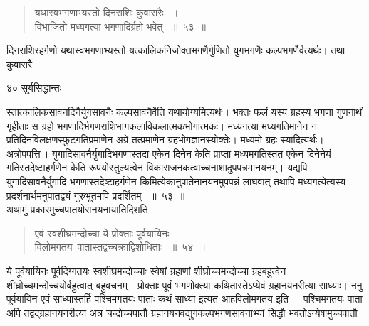 \documentclass[11pt, openany]{book}
\begin{document}
\begin{quote}

 {\ssi यथास्वभगणाभ्यस्तो दिनराशिः कुवासरैः ~।\\
विभाजितो मध्यगत्या भगणादिर्ग्रहो भवेत् ~॥~५३~॥}
\end{quote}
\begin{sloppypar}
 दिनराशिरहर्गणो यथास्वभगणाभ्यस्तो यत्कालिकनिजोक्तभगणैर्गुणितो युगभगणैः कल्पभगणैर्वत्यर्थः। तथा कुवासरै\textendash
\end{sloppypar}
\newpage


\noindent ४० \hspace{4cm} सूर्यसिद्धान्तः
\vspace{1cm}

\begin{sloppypar}
\noindent स्तात्कालिकसावनदिनैर्युगसावनैः कल्पसावनैर्वेति यथायोग्यमित्यर्थः। भक्तः फलं यस्य ग्रहस्य भगणा गुणनार्थं गृहीताः स ग्रहो भगणादिर्भगणराशिभागकलाविकलात्मकभोगात्मकः। मध्यगत्या मध्यगतिमानेन न प्रतिदिनविलक्षणस्फुटगतिप्रमाणेन अग्रे तत्प्रमाणेन ग्रहभोगज्ञानस्योक्तेः। मध्यमो ग्रहः स्यादित्यर्थः। अत्रोपपत्तिः। युगादिसावनैर्युगादिभगणास्तदा एकेन दिनेन केति प्राप्ता मध्यमगतिस्तत एकेन दिनेनेयं गतिस्तदेष्टाहर्गणेन केति रूपयोस्तुल्यत्वेन विकाराजनकत्वाच्चनाशादुपपन्नमानयनम्। यद्यपि युगादिसावनैर्युगादि भगणास्तदेष्टाहर्गणेन किमित्येकानुपातेनानयनमुपपन्नं लाघवात् तथापि मध्यगत्येत्यस्य प्रदर्शनार्थमनुपातद्वयं गुरुभूतमपि प्रदर्शितम् ~॥~५३~॥\\
\noindent अथामुं प्रकारमुच्चपातयोरानयनायातिदिशति\textendash
\end{sloppypar}
\begin{quote}

  {\ssi एवं स्वशीघ्रमन्दोच्चा ये प्रोक्ताः पूर्वयायिनः ~।\\
विलोमगतयः पातास्तद्वच्चक्राद्विशोधिताः ~॥~५४~॥}
\end{quote}
\begin{sloppypar}

 ये पूर्वयायिनः पूर्वदिग्गतयः स्वशीघ्रमन्दोच्चाः स्वेषां ग्रहाणां शीघ्रोच्चमन्दोच्चा ग्रहबहुत्वेन
शीघ्रोच्चमन्दोच्चयोर्बहुत्वात् बहुवचनम्। प्रोक्ताः पूर्वं भगणोक्त्या कथितास्तेऽप्येवं ग्रहानयनरीत्या साध्याः। ननु पूर्वयायिन एवं साध्यास्तर्हि पश्चिमगतयः पाताः कथं साध्या इत्यत आह\textendash विलोमगतय इति~। पश्चिमगतयः पाता अपि तद्वद्ग्रहानयनरीत्या अत्र चन्द्रोच्चपातौ ग्रहानयनवद्युगकल्पभगणसावनाभ्यां सिद्धौ भवतोऽन्येषामुच्चपातौ
\end{sloppypar}
\end{document}

